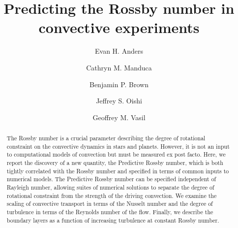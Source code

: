 \documentclass[twocolumn, amsmath, amsfonts, amssymb]{aastex62}
\begin{document}
\newcommand{\AB}{\citetalias{anders&brown2017}}

\title{Predicting the Rossby number in convective experiments}


\author{Evan H. Anders}
\author{Cathryn M. Manduca}
\author{Benjamin P. Brown}
\author{Jeffrey S. Oishi}
\author{Geoffrey M. Vasil}


\begin{abstract}
  The Rossby number is a crucial parameter describing the degree of rotational constraint on the convective dynamics in stars and planets. 
However, it is not an input to computational models of convection but must be measured ex post facto. 
Here, we report the discovery of a new quantity, the Predictive Rossby number, which is both tightly correlated with the Rossby number and specified in terms of common inputs to numerical models. 
The Predictive Rossby number can be specified independent of Rayleigh number, allowing suites of numerical solutions to separate the degree of rotational constraint from the strength of the driving convection.  
We examine the scaling of convective transport in terms of the Nusselt number and the degree of turbulence in terms of the Reynolds number of the flow. 
Finally, we describe the boundary layers as a function of increasing turbulence at constant Rossby number.
\end{abstract}


\end{document}
